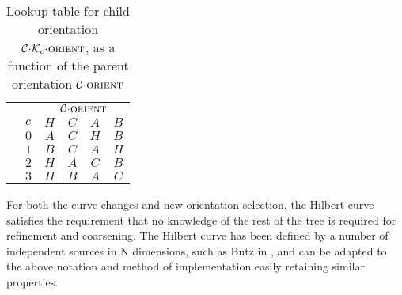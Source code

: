 \documentclass[twoside]{IIBproject}
\newcommand{\acc}{{\mkern 0.5mu\cdot\mkern 0.5mu}}
\numberwithin{figure}{section}
\begin{document}
            \begin{table}[!htbp]
                \centering
                \captionsetup{width=0.8\textwidth}
                \caption{Lookup table for child orientation $\mathcal{C}\acc\mathcal{K}_c\acc\textproc{orient}$, as a function of the parent orientation $\mathcal{C}\acc\textproc{orient}$}
                \label{tab:hilb-Dc}
                \begin{tabularx}{5cm}{l>{\raggedright}X*{4}{c}}
                    \toprule
                    &   & \multicolumn{4}{c}{$\mathcal{C}\acc\textproc{orient}$} \\ \cmidrule{3-6}
                    & $c$   & $H$    & $C$    & $A$    & $B$    \\ \midrule
                    & $0$   & $A$    & $C$    & $H$    & $B$    \\
                    & $1$   & $B$    & $C$    & $A$    & $H$    \\
                    & $2$   & $H$    & $A$    & $C$    & $B$    \\
                    & $3$   & $H$    & $B$    & $A$    & $C$    \\ \bottomrule
                \end{tabularx}
            \end{table}

            For both the curve changes and new orientation selection, the Hilbert curve satisfies the requirement that no knowledge of the rest of the tree is required for refinement and coarsening. The Hilbert curve has been defined by a number of independent sources in N dimensions, such as Butz in \cite{butz71}, and can be adapted to the above notation and method of implementation easily retaining similar properties. 
\end{document}
